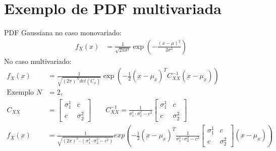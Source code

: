 \documentclass{article}
\renewcommand\u[1]{\underbar{#1}}
\begin{document}
\section{Exemplo de PDF multivariada}
PDF Gaussiana no caso monovariado:
\begin{align*}
f_X(x) &= \frac{1}{\sqrt{2\pi\sigma^2}} \exp\left({-\frac{(x-\mu)^2}{2\sigma^2}}\right)
\end{align*}
No caso multivariado:
\begin{align*}
    f_X(\u{x}) &= \frac{1}{\sqrt{(2\pi)^N det(C_{\u{x}})}} \exp\left({-\frac{1}{2} (\u{x}-\mu_{\u{x}})^T C_{XX}^{-1}(\u{x}-\mu_{\u{x}})}\right) \\
    \text{Exemplo } N &= 2, \\
    C_{XX} &=
    \begin{bmatrix}
        \sigma^1_1 & c\\
        c & \sigma^2_2
    \end{bmatrix} \qquad
    C_{XX}^{-1} = \frac{1}{\sigma_1^1 \cdot \sigma_2^2 - c^2}
    \begin{bmatrix}
        \sigma^1_1 & c\\
        c & \sigma^2_2
    \end{bmatrix} \\
    f_X(\u{x}) &= \frac{1}{\sqrt{(2 \pi)^2 \cdot (\sigma_1^1 \cdot \sigma_2^2 - c^2)}}
    exp\left({-\frac{1}{2} (\u{x}-\mu_{\u{x}})^T \frac{1}{\sigma_1^1 \cdot \sigma_2^2 - c^2}
        \begin{bmatrix}
            \sigma^1_1 & c\\
            c & \sigma^2_2
        \end{bmatrix}
    (\u{x}-\mu_{\u{x}})}\right)
\end{align*}
\end{document}
